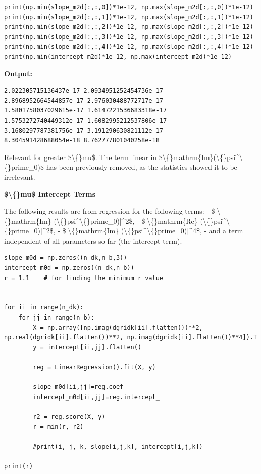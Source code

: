\documentclass{article}
\begin{document}
\begin{lstlisting}
print(np.min(slope_m2d[:,:,0])*1e-12, np.max(slope_m2d[:,:,0])*1e-12)
print(np.min(slope_m2d[:,:,1])*1e-12, np.max(slope_m2d[:,:,1])*1e-12)
print(np.min(slope_m2d[:,:,2])*1e-12, np.max(slope_m2d[:,:,2])*1e-12)
print(np.min(slope_m2d[:,:,3])*1e-12, np.max(slope_m2d[:,:,3])*1e-12)
print(np.min(slope_m2d[:,:,4])*1e-12, np.max(slope_m2d[:,:,4])*1e-12)
print(np.min(intercept_m2d)*1e-12, np.max(intercept_m2d)*1e-12)\end{lstlisting}

\textbf{Output:}\begin{verbatim}
2.022305715136437e-17 2.0934951252454736e-17
2.8968952664544857e-17 2.976030488772717e-17
1.5801758037029615e-17 1.6147221536683318e-17
1.5753272740449312e-17 1.6082995212537806e-17
3.1680297787381756e-17 3.191290630821112e-17
8.304591428688054e-18 8.762777801040258e-18

\end{verbatim}

Relevant for greater \$\textbackslash\{\}mu\$. The term linear in \$\textbackslash\{\}mathrm\{Im\}(\textbackslash\{\}psi\textasciicircum{}\textbackslash\{\}prime\_0)\$ has been previously removed, as the statistics showed it to be irrelevant. 

\textbf{\$\textbackslash\{\}mu\$ Intercept Terms}

The following results are from regression for the following terms: 
 - \$|\textbackslash\{\}mathrm\{Im\} (\textbackslash\{\}psi\textasciicircum{}\textbackslash\{\}prime\_0)|\textasciicircum{}2\$, 
 - \$|\textbackslash\{\}mathrm\{Re\} (\textbackslash\{\}psi\textasciicircum{}\textbackslash\{\}prime\_0)|\textasciicircum{}2\$,
 - \$|\textbackslash\{\}mathrm\{Im\} (\textbackslash\{\}psi\textasciicircum{}\textbackslash\{\}prime\_0)|\textasciicircum{}4\$,
 - and a term independent of all parameters so far (the intercept term).

\begin{lstlisting}
slope_m0d = np.zeros((n_dk,n_b,3))
intercept_m0d = np.zeros((n_dk,n_b))
r = 1.1    # for finding the minimum r value


for ii in range(n_dk):
    for jj in range(n_b):
        X = np.array([np.imag(dgridk[ii].flatten())**2, np.real(dgridk[ii].flatten())**2, np.imag(dgridk[ii].flatten())**4]).T
        y = intercept[ii,jj].flatten()

        reg = LinearRegression().fit(X, y)

        slope_m0d[ii,jj]=reg.coef_
        intercept_m0d[ii,jj]=reg.intercept_

        r2 = reg.score(X, y)
        r = min(r, r2)

        #print(i, j, k, slope[i,j,k], intercept[i,j,k])

print(r)\end{lstlisting}
\end{document}
